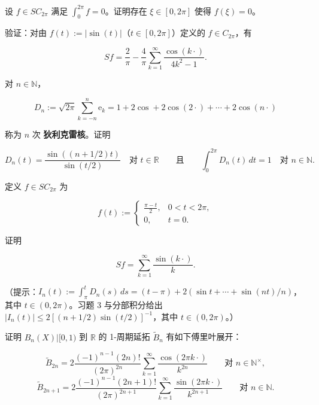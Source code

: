 \exerciseshead

\begin{exercises}
\item

设 $ f \in SC_{2\pi} $ 满足 $ \int_{0}^{2\pi} f = 0 $。证明存在 $ \xi \in [0, 2\pi] $ 使得 $ f(\xi) = 0 $。

\item

验证：对由 $ f(t) := |\sin(t)| $（$ t \in [0, 2\pi] $）定义的 $ f \in C_{2\pi} $，有

\[
Sf = \frac{2}{\pi} - \frac{4}{\pi}\sum_{k=1}^{\infty}\frac{\cos(k\cdot)}{4k^{2} - 1} .
\]
\item

对 $ n \in \mathbb{N} $，

\[
D_{n} := \sqrt{2\pi}\sum_{k=-n}^{n}\mathrm{e}_{k} = 1 + 2\cos + 2\cos(2\cdot) + \cdots + 2\cos(n\cdot)
\]

称为 $ n $ 次 \textbf{狄利克雷核}。证明

\[
D_{n}(t) = \frac{\sin((n + 1/2)t)}{\sin(t/2)} \quad \text{对 } t \in \mathbb{R} \qquad \text{且} \qquad \int_{0}^{2\pi} D_{n}(t)\, dt = 1 \quad \text{对 } n \in \mathbb{N} .
\]
\item

定义 $ f \in SC_{2\pi} $ 为

\begin{equation*}
f(t) := \begin{cases} \frac{\pi - t}{2} , & 0 < t < 2\pi , \\ 0 , & t = 0 . \end{cases}
\end{equation*}

证明

\[
Sf = \sum_{k=1}^{\infty}\frac{\sin(k\cdot)}{k} .
\]

（提示：$ I_{n}(t) := \int_{\pi}^{t} D_{n}(s)\, ds = (t - \pi) + 2(\sin t + \cdots + \sin(nt)/n) $，其中 $ t \in (0, 2\pi) $。习题 3 与分部积分给出 $ |I_{n}(t)| \le 2[(n + 1/2)\sin(t/2)]^{-1} $，其中 $ t \in (0, 2\pi) $。）

\item

证明 $ B_{n}(X)|[0, 1) $ 到 $ \mathbb{R} $ 的 1-周期延拓 $ \widetilde{B}_{n} $ 有如下傅里叶展开：

\begin{equation}
\widetilde{B}_{2n} = 2\frac{(-1)^{n-1}(2n)!}{(2\pi)^{2n}}\sum_{k=1}^{\infty}\frac{\cos(2\pi k\cdot)}{k^{2n}} \qquad \text{对 } n \in \mathbb{N}^{\times} ,\tag{7.24}
\end{equation}
\begin{equation}
\widetilde{B}_{2n+1} = 2\frac{(-1)^{n-1}(2n+1)!}{(2\pi)^{2n+1}}\sum_{k=1}^{\infty}\frac{\sin(2\pi k\cdot)}{k^{2n+1}} \qquad \text{对 } n \in \mathbb{N} .\tag{7.25}
\end{equation}


\end{exercises}
